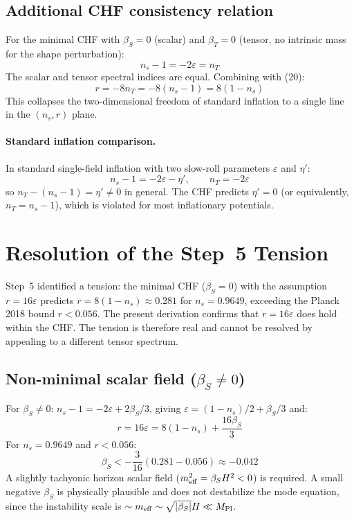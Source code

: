 \documentclass[12pt,a4paper]{article}
\begin{document}
\subsection{Additional CHF consistency relation}

For the minimal CHF with $\beta_S = 0$ (scalar) and $\beta_T = 0$ (tensor, no intrinsic mass for the shape perturbation):
\begin{equation}
n_s - 1 = -2\varepsilon = n_T \tag{21}
\end{equation}
The scalar and tensor spectral indices are equal. Combining with (20):
\begin{equation}
r = -8n_T = -8(n_s - 1) = 8(1 - n_s) \tag{22}
\end{equation}
This collapses the two-dimensional freedom of standard inflation to a single line in the $(n_s, r)$ plane.

\paragraph{Standard inflation comparison.} In standard single-field inflation with two slow-roll parameters $\varepsilon$ and $\eta'$:
\begin{equation}
n_s - 1 = -2\varepsilon - \eta', \qquad n_T = -2\varepsilon \tag{23}
\end{equation}
so $n_T - (n_s - 1) = \eta' \neq 0$ in general. The CHF predicts $\eta' = 0$ (or equivalently, $n_T = n_s - 1$), which is violated for most inflationary potentials.

\section{Resolution of the Step~5 Tension}

Step~5 identified a tension: the minimal CHF ($\beta_S = 0$) with the assumption $r = 16\varepsilon$ predicts $r = 8(1-n_s) \approx 0.281$ for $n_s = 0.9649$, exceeding the Planck 2018 bound $r < 0.056$. The present derivation confirms that $r = 16\varepsilon$ does hold within the CHF. The tension is therefore real and cannot be resolved by appealing to a different tensor spectrum.

\subsection{Non-minimal scalar field ($\beta_S \neq 0$)}

For $\beta_S \neq 0$: $n_s - 1 = -2\varepsilon + 2\beta_S/3$, giving $\varepsilon = (1-n_s)/2 + \beta_S/3$ and:
\begin{equation}
r = 16\varepsilon = 8(1 - n_s) + \frac{16\beta_S}{3} \tag{24}
\end{equation}
For $n_s = 0.9649$ and $r < 0.056$:
\begin{equation}
\beta_S < -\frac{3}{16}(0.281 - 0.056) \approx -0.042 \tag{25}
\end{equation}
A slightly tachyonic horizon scalar field ($m_{\rm eff}^2 = \beta_S H^2 < 0$) is required. A small negative $\beta_S$ is physically plausible and does not destabilize the mode equation, since the instability scale is $\sim m_{\rm eff} \sim \sqrt{|\beta_S|}H \ll M_{\rm Pl}$.
\end{document}
